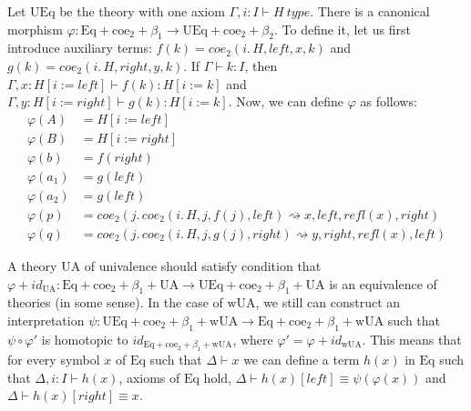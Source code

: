 \documentclass{mscs}
\newcommand{\deq}{\equiv}
\newcommand{\repl}{:=}
\newcommand{\idtype}{\rightsquigarrow}
\newcommand{\wUA}{\mathrm{wUA}}
\newcommand{\UA}{\mathrm{UA}}
\newcommand{\coe}{\mathrm{coe}}
\newcommand{\Eq}{\mathrm{Eq}}
\newcommand{\UEq}{\mathrm{UEq}}
\numberwithin{figure}{section}
\begin{document}
Let $\UEq$ be the theory with one axiom $\Gamma, i : I \vdash H\ type$.
There is a canonical morphism $\varphi : \Eq + \coe_2 + \beta_1 \to \UEq + \coe_2 + \beta_2$.
To define it, let us first introduce auxiliary terms: $f(k) = coe_2(i.\,H, left, x, k)$ and $g(k) = coe_2(i.\,H, right, y, k)$.
If $\Gamma \vdash k : I$, then $\Gamma, x : H[i \repl left] \vdash f(k) : H[i \repl k]$ and $\Gamma, y : H[i \repl right] \vdash g(k) : H[i \repl k]$.
Now, we can define $\varphi$ as follows:
\begin{align*}
\varphi(A) & = H[i \repl left] \\
\varphi(B) & = H[i \repl right] \\
\varphi(b) & = f(right) \\
\varphi(a_1) & = g(left) \\
\varphi(a_2) & = g(left) \\
\varphi(p) & = coe_2(j.\,coe_2(i.\,H, j, f(j), left) \idtype x, left, refl(x), right) \\
\varphi(q) & = coe_2(j.\,coe_2(i.\,H, j, g(j), right) \idtype y, right, refl(x), left)
\end{align*}

A theory $\UA$ of univalence should satisfy condition that $\varphi + id_{\UA} : \Eq + \coe_2 + \beta_1 + \UA \to \UEq + \coe_2 + \beta_1 + \UA$ is an equivalence of theories (in some sense).
In the case of $\wUA$, we still can construct an interpretation $\psi : \UEq + \coe_2 + \beta_1 + \wUA \to \Eq + \coe_2 + \beta_1 + \wUA$ such that $\psi \circ \varphi'$ is homotopic to $id_{\Eq + \coe_2 + \beta_1 + \wUA}$, where $\varphi' = \varphi + id_{\wUA}$.
This means that for every symbol $x$ of $\Eq$ such that $\Delta \vdash x$ we can define a term $h(x)$ in $\Eq$ such that
$\Delta, i : I \vdash h(x)$, axioms of $\Eq$ hold, $\Delta \vdash h(x)[left] \deq \psi(\varphi(x))$ and $\Delta \vdash h(x)[right] \deq x$.
\end{document}
